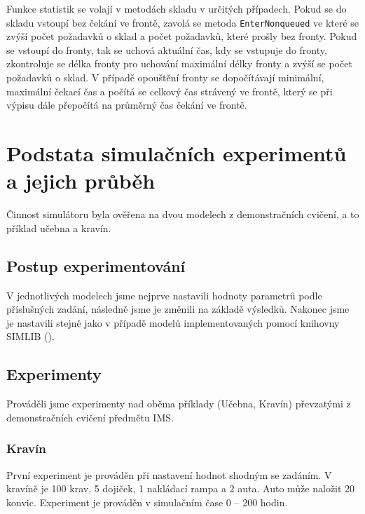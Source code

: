 \documentclass[12pt,a4paper,titlepage,final]{article}
\begin{document}
Funkce statistik se volají v metodách skladu v určitých případech. Pokud se do skladu vstoupí bez čekání ve frontě, zavolá se metoda \texttt{EnterNonqueued} ve které se zvýší počet požadavků o sklad a počet požadavků, které prošly bez fronty. Pokud se vstoupí do fronty, tak se uchová aktuální čas, kdy se vstupuje do fronty, zkontroluje se délka fronty pro uchování maximální délky fronty a zvýší se počet požadavků o sklad. V případě opouštění fronty se dopočítávají minimální, maximální čekací čas a počítá se celkový čas strávený ve frontě, který se při výpisu dále přepočítá na průměrný čas čekání ve frontě.

\section{Podstata simulačních experimentů a jejich průběh}

Činnost simulátoru byla ověřena na dvou modelech z demonstračních cvičení, a to příklad učebna a kravín.

\subsection{Postup experimentování} 

V jednotlivých modelech jsme nejprve nastavili hodnoty parametrů podle příslušných zadání, následně jsme je změnili na základě výsledků. Nakonec jsme je nastavili stejně jako v případě modelů implementovaných pomocí knihovny SIMLIB (\cite{priklady}).

\subsection{Experimenty}

Prováděli jsme experimenty nad oběma příklady (Učebna, Kravín) převzatými z demonstračních cvičení předmětu IMS.

\subsubsection{ Kravín}

První experiment je prováděn při nastavení hodnot shodným se zadáním. V kravíně je 100 krav, 5 dojiček, 1 nakládací rampa a 2 auta. Auto může naložit 20 konvic. Experiment je prováděn v simulačním čase 0 -- 200 hodin.
\end{document}
